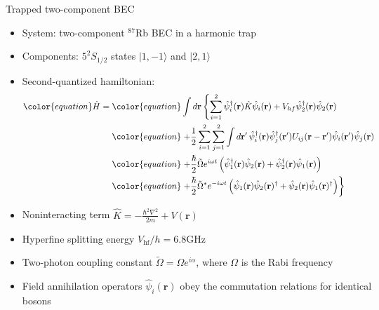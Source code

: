 \documentclass[final,hyperref={pdfpagelabels=false}]{beamer}
\newcommand{\Rb}{$^{87}$Rb }
\begin{document}
\begin{frame}
\begin{columns}
{\begin{block}{Trapped two-component BEC}
\begin{itemize}
	\item System: two-component \Rb BEC in a harmonic trap
	\item Components: $5^2S_{1/2}$ states $\vert1,-1\rangle$ and $\vert2,1\rangle$
	\item Second-quantized hamiltonian:
\begin{align*}
\begin{split}\color{equation}
\hat{H} = {} &\color{equation} \int d\mathbf{r} \left\{
	\sum\limits^2_{i=1} \hat{\psi}_i^\dagger(\mathbf{r}) \hat{K} \hat{\psi}_i(\mathbf{r}) +
	V_{hf} \hat{\psi}_2^\dagger(\mathbf{r}) \hat{\psi}_2(\mathbf{r}) \right. \\
& \color{equation}\left. + \frac{1}{2} \sum\limits^2_{i=1} \sum\limits^2_{j=1} \int d\mathbf{r}^\prime \,
	\hat{\psi}_i^\dagger (\mathbf{r}) \hat{\psi}_j^\dagger (\mathbf{r}^\prime)
	U_{ij}(\mathbf{r} - \mathbf{r}^\prime)
	\hat{\psi}_i(\mathbf{r}^\prime) \hat{\psi}_j(\mathbf{r}) \right. \\
& \color{equation}\left. + \frac{\hbar}{2} \tilde{\Omega} e^{i \omega t} \left(
		\hat{\psi}_1^\dagger(\mathbf{r}) \hat{\psi}_2(\mathbf{r}) +
		\hat{\psi}_2^\dagger(\mathbf{r}) \hat{\psi}_1(\mathbf{r})
	\right) \right. \\
& \color{equation} \left. + \frac{\hbar}{2} \tilde{\Omega}^* e^{-i \omega t} \left(
		\hat{\psi}_1(\mathbf{r}) \hat{\psi}_2(\mathbf{r})^\dagger +
		\hat{\psi}_2(\mathbf{r}) \hat{\psi}_1(\mathbf{r})^\dagger
	\right)
\right\}
\end{split}
\end{align*}
	\item Noninteracting term $\hat{K} = - \frac{\hbar^2 \nabla^2}{2 m} + V(\mathbf{r})$
	\item Hyperfine splitting energy $V_{\textrm{hf}} / h = 6.8 \textrm{GHz}$
	\item Two-photon coupling constant $\tilde{\Omega} = \Omega e^{i \alpha}$,
		where $\Omega$ is the Rabi frequency
	\item Field annihilation operators $\hat{\psi}_i (\mathbf{r})$ obey the commutation relations for identical bosons
\end{itemize}

\end{block}

}
\end{columns}
\end{frame}
\end{document}

